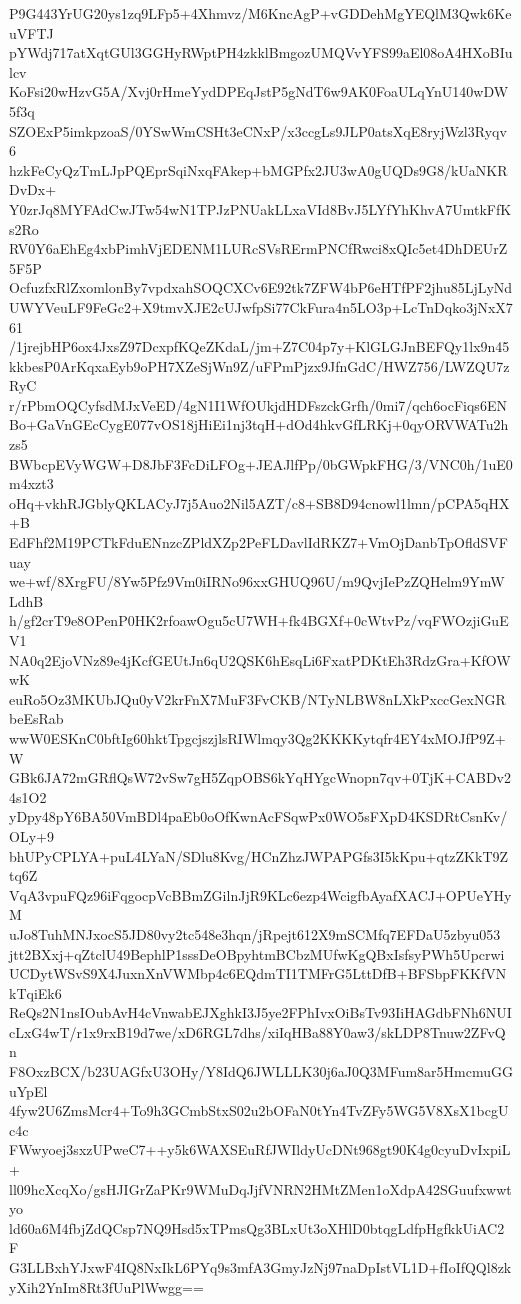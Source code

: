 P9G443YrUG20ys1zq9LFp5+4Xhmvz/M6KncAgP+vGDDehMgYEQlM3Qwk6KeuVFTJ
pYWdj717atXqtGUl3GGHyRWptPH4zkklBmgozUMQVvYFS99aEl08oA4HXoBIulcv
KoFsi20wHzvG5A/Xvj0rHmeYydDPEqJstP5gNdT6w9AK0FoaULqYnU140wDW5f3q
SZOExP5imkpzoaS/0YSwWmCSHt3eCNxP/x3ccgLs9JLP0atsXqE8ryjWzl3Ryqv6
hzkFeCyQzTmLJpPQEprSqiNxqFAkep+bMGPfx2JU3wA0gUQDs9G8/kUaNKRDvDx+
Y0zrJq8MYFAdCwJTw54wN1TPJzPNUakLLxaVId8BvJ5LYfYhKhvA7UmtkFfKs2Ro
RV0Y6aEhEg4xbPimhVjEDENM1LURcSVsRErmPNCfRwci8xQIc5et4DhDEUrZ5F5P
OcfuzfxRlZxomlonBy7vpdxahSOQCXCv6E92tk7ZFW4bP6eHTfPF2jhu85LjLyNd
UWYVeuLF9FeGc2+X9tmvXJE2cUJwfpSi77CkFura4n5LO3p+LcTnDqko3jNxX761
/1jrejbHP6ox4JxsZ97DcxpfKQeZKdaL/jm+Z7C04p7y+KlGLGJnBEFQy1lx9n45
kkbesP0ArKqxaEyb9oPH7XZeSjWn9Z/uFPmPjzx9JfnGdC/HWZ756/LWZQU7zRyC
r/rPbmOQCyfsdMJxVeED/4gN1I1WfOUkjdHDFszckGrfh/0mi7/qch6ocFiqs6EN
Bo+GaVnGEcCygE077vOS18jHiEi1nj3tqH+dOd4hkvGfLRKj+0qyORVWATu2hzs5
BWbcpEVyWGW+D8JbF3FcDiLFOg+JEAJlfPp/0bGWpkFHG/3/VNC0h/1uE0m4xzt3
oHq+vkhRJGblyQKLACyJ7j5Auo2Nil5AZT/c8+SB8D94cnowl1lmn/pCPA5qHX+B
EdFhf2M19PCTkFduENnzcZPldXZp2PeFLDavlIdRKZ7+VmOjDanbTpOfldSVFuay
we+wf/8XrgFU/8Yw5Pfz9Vm0iIRNo96xxGHUQ96U/m9QvjIePzZQHelm9YmWLdhB
h/gf2crT9e8OPenP0HK2rfoawOgu5cU7WH+fk4BGXf+0cWtvPz/vqFWOzjiGuEV1
NA0q2EjoVNz89e4jKcfGEUtJn6qU2QSK6hEsqLi6FxatPDKtEh3RdzGra+KfOWwK
euRo5Oz3MKUbJQu0yV2krFnX7MuF3FvCKB/NTyNLBW8nLXkPxccGexNGRbeEsRab
wwW0ESKnC0bftIg60hktTpgcjszjlsRIWlmqy3Qg2KKKKytqfr4EY4xMOJfP9Z+W
GBk6JA72mGRflQsW72vSw7gH5ZqpOBS6kYqHYgcWnopn7qv+0TjK+CABDv24s1O2
yDpy48pY6BA50VmBDl4paEb0oOfKwnAcFSqwPx0WO5sFXpD4KSDRtCsnKv/OLy+9
bhUPyCPLYA+puL4LYaN/SDlu8Kvg/HCnZhzJWPAPGfs3I5kKpu+qtzZKkT9Ztq6Z
VqA3vpuFQz96iFqgocpVcBBmZGilnJjR9KLc6ezp4WcigfbAyafXACJ+OPUeYHyM
uJo8TuhMNJxocS5JD80vy2tc548e3hqn/jRpejt612X9mSCMfq7EFDaU5zbyu053
jtt2BXxj+qZtclU49BephlP1sssDeOBpyhtmBCbzMUfwKgQBxIsfsyPWh5Upcrwi
UCDytWSvS9X4JuxnXnVWMbp4c6EQdmTI1TMFrG5LttDfB+BFSbpFKKfVNkTqiEk6
ReQs2N1nsIOubAvH4cVnwabEJXghkI3J5ye2FPhIvxOiBsTv93IiHAGdbFNh6NUI
cLxG4wT/r1x9rxB19d7we/xD6RGL7dhs/xiIqHBa88Y0aw3/skLDP8Tnuw2ZFvQn
F8OxzBCX/b23UAGfxU3OHy/Y8IdQ6JWLLLK30j6aJ0Q3MFum8ar5HmcmuGGuYpEl
4fyw2U6ZmsMcr4+To9h3GCmbStxS02u2bOFaN0tYn4TvZFy5WG5V8XsX1bcgUc4c
FWwyoej3sxzUPweC7++y5k6WAXSEuRfJWIldyUcDNt968gt90K4g0cyuDvIxpiL+
ll09hcXcqXo/gsHJIGrZaPKr9WMuDqJjfVNRN2HMtZMen1oXdpA42SGuufxwwtyo
ld60a6M4fbjZdQCsp7NQ9Hsd5xTPmsQg3BLxUt3oXHlD0btqgLdfpHgfkkUiAC2F
G3LLBxhYJxwF4IQ8NxIkL6PYq9s3mfA3GmyJzNj97naDpIstVL1D+fIoIfQQl8zk
yXih2YnIm8Rt3fUuPlWwgg==
